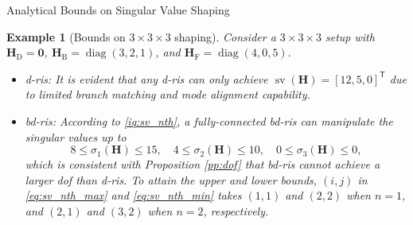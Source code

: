 \documentclass[journal]{IEEEtran}
\DeclareMathOperator{\diag}{diag}
\DeclareMathOperator{\sv}{sv}
\newtheorem{example}{Example}
\begin{document}
\begin{section}{Analytical Bounds on Singular Value Shaping}
		\begin{example}[Bounds on $3 \times 3 \times 3$ shaping]\label{eg:bounds}
			Consider a $3 \times 3 \times 3$ setup with $\mathbf{H}_\mathrm{D} = \mathbf{0}$, $\mathbf{H}_\mathrm{B} = \diag(3, 2, 1)$, and $\mathbf{H}_\mathrm{F} = \diag(4, 0, 5)$.
			\begin{itemize}
				\item \gls{d}-\gls{ris}: It is evident that any \gls{d}-\gls{ris} can only achieve $\sv(\mathbf{H}) = [12, 5, 0]^\mathsf{T}$ due to limited branch matching and mode alignment capability.
				\item \gls{bd}-\gls{ris}: According to \eqref{iq:sv_nth}, a fully-connected \gls{bd}-\gls{ris} can manipulate the singular values up to
				\begin{equation*}
					8 \le \sigma_1(\mathbf{H}) \le 15, \quad 4 \le \sigma_2(\mathbf{H}) \le 10, \quad 0 \le \sigma_3(\mathbf{H}) \le 0,
				\end{equation*}
				which is consistent with Proposition \ref{pp:dof} that \gls{bd}-\gls{ris} cannot achieve a larger \gls{dof} than \gls{d}-\gls{ris}.
				To attain the upper and lower bounds, $(i,j)$ in \eqref{eq:sv_nth_max} and \eqref{eq:sv_nth_min} takes $(1, 1)$ and $(2, 2)$ when $n=1$, and $(2, 1)$ and $(3, 2)$ when $n=2$, respectively.

\end{itemize}
\end{example}
\end{section}
\end{document}
